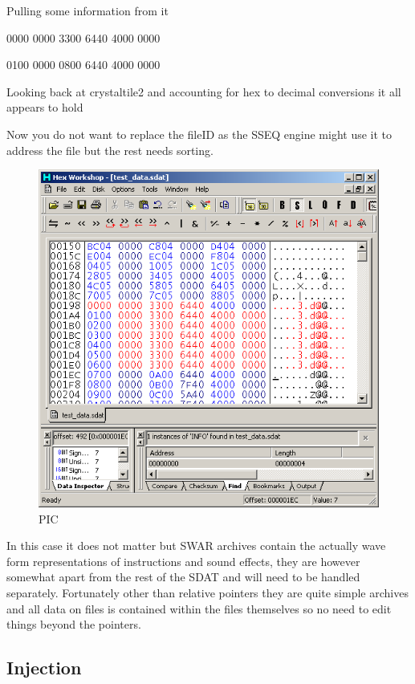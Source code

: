 \documentclass[
]{book}
\begin{document}
Pulling some information from it

0000 0000 3300 6440 4000 0000

0100 0000 0800 6440 4000 0000

Looking back at crystaltile2 and accounting for hex to decimal conversions it all appears to hold

Now you do not want to replace the fileID as the SSEQ engine might use it to address the file but the rest needs sorting.

\begin{figure}
\centering
\includegraphics{images/143_home_fast6191_romhackingguide_unrenamed_files_and_original_borders_relinkinghexworkshop4.png}
\caption{PIC}
\end{figure}

In this case it does not matter but SWAR archives contain the actually wave form representations of instructions and sound effects, they are however somewhat apart from the rest of the SDAT and will need to be handled separately. Fortunately other than relative pointers they are quite simple archives and all data on files is contained within the files themselves so no need to edit things beyond the pointers.

\hypertarget{injection}{%
\subsection{Injection}\label{injection}}
\end{document}
